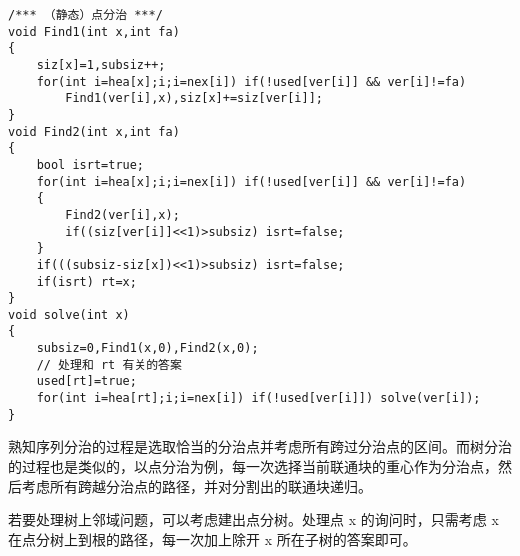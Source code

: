 \begin{verbatim}
/*** （静态）点分治 ***/
void Find1(int x,int fa)
{
    siz[x]=1,subsiz++;
    for(int i=hea[x];i;i=nex[i]) if(!used[ver[i]] && ver[i]!=fa)
        Find1(ver[i],x),siz[x]+=siz[ver[i]];
}
void Find2(int x,int fa)
{
    bool isrt=true;
    for(int i=hea[x];i;i=nex[i]) if(!used[ver[i]] && ver[i]!=fa)
    {
        Find2(ver[i],x);
        if((siz[ver[i]]<<1)>subsiz) isrt=false;
    }
    if(((subsiz-siz[x])<<1)>subsiz) isrt=false;
    if(isrt) rt=x;
}
void solve(int x)
{
    subsiz=0,Find1(x,0),Find2(x,0);
    // 处理和 rt 有关的答案
    used[rt]=true;
    for(int i=hea[rt];i;i=nex[i]) if(!used[ver[i]]) solve(ver[i]);
}
\end{verbatim}

熟知序列分治的过程是选取恰当的分治点并考虑所有跨过分治点的区间。而树分治的过程也是类似的，以点分治为例，每一次选择当前联通块的重心作为分治点，然后考虑所有跨越分治点的路径，并对分割出的联通块递归。

若要处理树上邻域问题，可以考虑建出点分树。处理点 x 的询问时，只需考虑 x 在点分树上到根的路径，每一次加上除开 x 所在子树的答案即可。

\inputminted{cpp}{src/data structure/tree-divide.cpp}